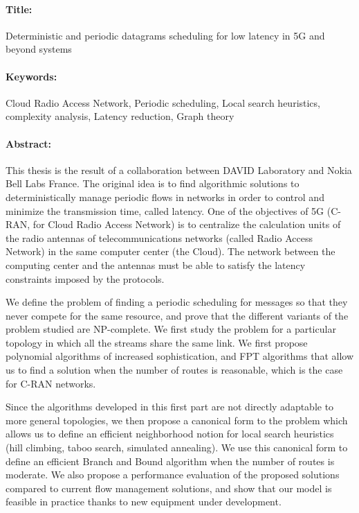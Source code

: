 \begin{mdframed}[linecolor=Prune,linewidth=1]
\vspace{-.25cm}
\paragraph*{Title:} Deterministic and periodic datagrams scheduling for low latency in 5G and beyond systems

\begin{small}
\vspace{-.25cm}
\paragraph*{Keywords:}  Cloud Radio Access Network, Periodic scheduling, Local search heuristics, complexity analysis, Latency reduction,  Graph theory
\vspace{-.5cm}
\begin{multicols}{2}
\paragraph*{Abstract:} This thesis is the result of a collaboration between DAVID Laboratory and Nokia Bell Labs France.
The original idea is to find algorithmic solutions to deterministically manage periodic flows in networks in order to control and minimize the transmission time, called latency. One of the objectives of 5G (C-RAN, for Cloud Radio Access Network) is to centralize the calculation units of the radio antennas of telecommunications networks (called Radio Access Network) in the same computer center (the Cloud). The network between the computing center and the antennas must be able to satisfy the latency constraints imposed by the protocols.

We define the problem of finding a periodic scheduling for messages so that they never compete for the same resource, and prove that the different variants of the problem studied are NP-complete. We first study the problem for a particular topology in which all the streams share the same link. We first propose polynomial algorithms of increased sophistication, and FPT algorithms that allow us to find a solution when the number of routes is reasonable, which is the case for C-RAN networks.

Since the algorithms developed in this first part are not directly adaptable to more general topologies, we then propose a canonical form to the problem which allows us to define an efficient neighborhood notion for local search heuristics (hill climbing, taboo search, simulated annealing). We use this canonical form to define an efficient Branch and Bound algorithm when the number of routes is moderate.
We also propose a performance evaluation of the proposed solutions compared to current flow management solutions, and show that our model is feasible in practice thanks to new equipment under development.

\end{multicols}
\end{small}
\end{mdframed}

